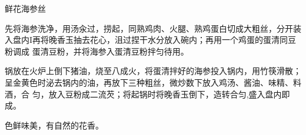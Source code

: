 \begin{recipe}{鲜花海参丝}

\ingredients


\preparation

\step 先将海参洗净，用汤汆过，捞起，同熟鸡肉、火腿、熟鸡蛋白切成大粗丝，分开装
入盘内I再将晚香玉抽去花心，沮过捏干水分放入碗内；再用一个鸡蛋的蛋清同豆粉调成
蛋清豆粉，并将海参入蛋清豆粉拌匀待用。

\step 锅放在火炉上倒下猪油，烧至八成火，将蛋清拌好的海参投入锅内，用竹筷滑散；
呈金黄色时泌去锅内的油，再放下三种粗丝，微炒数下放入鸡汤、酱油、味精、料酒，合
匀，放入豆粉成二流芡；将起锅时将晚香玉倒下，造转合匀,盛入盘内即成。

\features

色鲜味美，有自然的花香。

\end{recipe}

